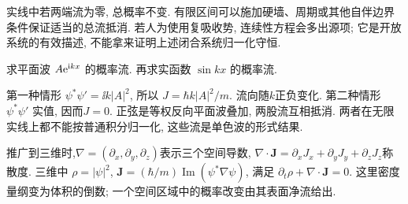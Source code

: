 实线中若两端流为零, 总概率不变. 有限区间可以施加硬墙、周期或其他自伴边界条件保证适当的总流抵消. 若人为使用复吸收势, 连续性方程会多出源项; 它是开放系统的有效描述, 不能拿来证明上述闭合系统归一化守恒.

\begin{example}
求平面波 $A\mathrm e^{\mathrm i kx}$ 的概率流. 再求实函数 $\sin kx$ 的概率流.
\end{example}
\begin{solution}
第一种情形 $\psi^*\psi'=\ii k|A|^2$, 所以 $J=\hbar k|A|^2/m$. 流向随$k$正负变化. 第二种情形 $\psi^*\psi'$ 实值, 因而$J=0$. 正弦是等权反向平面波叠加, 两股流互相抵消. 两者在无限实线上都不能按普通积分归一化, 这些流是单色波的形式结果.
\end{solution}

推广到三维时,$\nabla=(\partial_x,\partial_y,\partial_z)$表示三个空间导数, $\nabla\cdot\boldsymbol J=\partial_xJ_x+\partial_yJ_y+\partial_zJ_z$称散度. 三维中 $\rho=|\psi|^2$, $\boldsymbol J=(\hbar/m)\operatorname{Im}(\psi^*\nabla\psi)$, 满足 $\partial_t\rho+\nabla\cdot\boldsymbol J=0$. 这里密度量纲变为体积的倒数; 一个空间区域中的概率改变由其表面净流给出.
